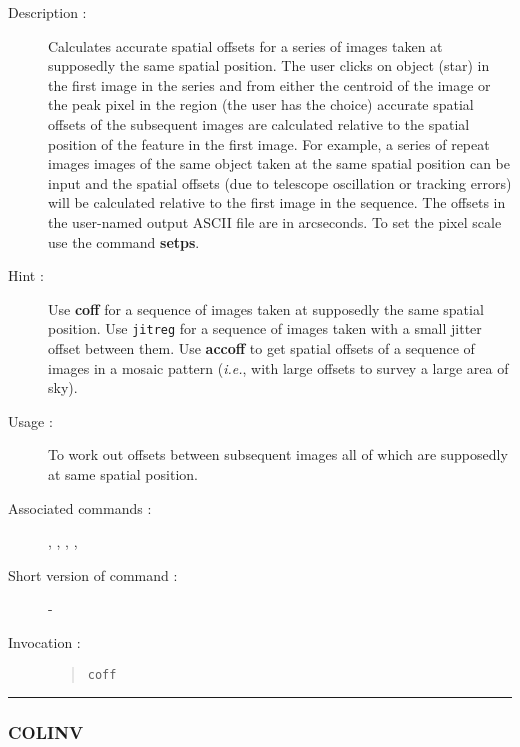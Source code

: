 \begin{description}

\item[Description :] Calculates accurate spatial offsets for a series
of images taken at supposedly the same spatial position. The user
clicks on object (star) in the first image in the series and from
either the centroid of the image or the peak pixel in the region (the
user has the choice) accurate spatial offsets of the subsequent images
are calculated relative to the spatial position of the feature in the
first image.  For example, a series of repeat images images of the same
object taken at the same spatial position can be input and the spatial
offsets (due to telescope oscillation or tracking errors) will be
calculated relative to the first image in the sequence.  The offsets in
the user-named output ASCII file are in arcseconds.  To set the pixel
scale use the command {\bf setps}.  

\item[Hint :] Use {\bf coff} for a sequence of images taken at supposedly the
same spatial position. Use {\tt jitreg} for a sequence of images taken with a
small jitter offset between them. Use {\bf accoff} to get spatial
offsets of a sequence of images in a mosaic pattern (\emph{i.e.}, with
large offsets to survey a large area of sky).

\item[Usage :] To work out offsets between subsequent images all of
which are supposedly at same spatial position.
\item[Associated commands :] {\tt {}}, 
{\tt {}}, {\tt {}}, 
{\tt {}}, {\tt {}}
\item[Short version of command :] -
\item[Invocation :]

\begin{quote}{\tt  coff }\end{quote}

\end{description}

\hrule 
\subsubsection*{\label{COLINV}COLINV}

